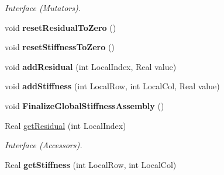 \begin{DoxyCompactItemize}
\begin{DoxyCompactList}\small\item\em Interface (Mutators). \item\end{DoxyCompactList}\item 
\hypertarget{structvoom_1_1_epetra_elliptic_result_a2789fe1e11ea64a594e29ce2413360a1}{
void {\bfseries resetResidualToZero} ()}
\label{structvoom_1_1_epetra_elliptic_result_a2789fe1e11ea64a594e29ce2413360a1}

\item 
\hypertarget{structvoom_1_1_epetra_elliptic_result_ab82ddea7dbe80852a4db04b040b83b63}{
void {\bfseries resetStiffnessToZero} ()}
\label{structvoom_1_1_epetra_elliptic_result_ab82ddea7dbe80852a4db04b040b83b63}

\item 
\hypertarget{structvoom_1_1_epetra_elliptic_result_af621e4868955b44a5b7d84b3b0094202}{
void {\bfseries addResidual} (int LocalIndex, Real value)}
\label{structvoom_1_1_epetra_elliptic_result_af621e4868955b44a5b7d84b3b0094202}

\item 
\hypertarget{structvoom_1_1_epetra_elliptic_result_aff28f290a66789dff23d47cf2b4d62ba}{
void {\bfseries addStiffness} (int LocalRow, int LocalCol, Real value)}
\label{structvoom_1_1_epetra_elliptic_result_aff28f290a66789dff23d47cf2b4d62ba}

\item 
\hypertarget{structvoom_1_1_epetra_elliptic_result_a33c14eb49019d5dbcc60dbdee0a93879}{
void {\bfseries FinalizeGlobalStiffnessAssembly} ()}
\label{structvoom_1_1_epetra_elliptic_result_a33c14eb49019d5dbcc60dbdee0a93879}

\item 
\hypertarget{structvoom_1_1_epetra_elliptic_result_affa111a21430ecfb7c79a98accf27f1f}{
Real \hyperlink{structvoom_1_1_epetra_elliptic_result_affa111a21430ecfb7c79a98accf27f1f}{getResidual} (int LocalIndex)}
\label{structvoom_1_1_epetra_elliptic_result_affa111a21430ecfb7c79a98accf27f1f}

\begin{DoxyCompactList}\small\item\em Interface (Accessors). \item\end{DoxyCompactList}\item 
\hypertarget{structvoom_1_1_epetra_elliptic_result_a40120a85cb6e4fbc5c6c0a9343012a71}{
Real {\bfseries getStiffness} (int LocalRow, int LocalCol)}
\label{structvoom_1_1_epetra_elliptic_result_a40120a85cb6e4fbc5c6c0a9343012a71}

\end{DoxyCompactItemize}


